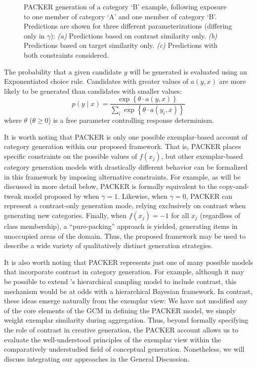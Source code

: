 \documentclass[12pt]{article}
\newcommand\inputpgf[2]{{
\let\pgfimageWithoutPath\pgfimage
\renewcommand{\pgfimage}[2][]{\pgfimageWithoutPath[##1]{#1/##2}}

}}
\begin{document}
\begin{flushleft}
\begin{figure}
	\begin{center}
		\inputpgf{figs/}{packer-examples.pgf}
		\caption{PACKER generation of a category `B' example, following exposure to one member of category `A' and one member of category `B'. Predictions are shown for three different parameterizations (differing only in $\gamma$): {\em (a)} Predictions based on contrast similarity only. {\em (b)} Predictions based on target similarity only.  {\em (c)} Predictions with both constraints considered.}
		\label{fig:packer-examples}
	\end{center}
\end{figure}

The probability that a given candidate $y$ will be generated is evaluated using an Exponentiated \citet{luce1977choice} choice rule. Candidates with greater values of $a(y,x)$ are more likely to be generated than candidates with smaller values:
% 
\begin{equation}
p(y \mid x) = \dfrac
{ \exp  \left \{ \theta \cdot a \left( y, x \right) \right \} } 
{ \sum_i{ \exp  \left \{ \theta \cdot a \left( y_i, x \right) \right\}  } }
\label{eq:packer-choice}
\end{equation}
% 
where $\theta$ ($\theta \geq 0$) is a free parameter controlling response determinism. 

It is worth noting that PACKER is only one possible exemplar-based account of category generation within our proposed framework. That is, PACKER places specific constraints on the possible values of $f(x_j)$, but other exemplar-based category generation models with drastically different behavior can be formalized in this framework by imposing alternative constraints. For example, as will be discussed in more detail below, PACKER is formally equivalent to the copy-and-tweak model proposed by \cite{jern2013probabilistic} when $\gamma = 1$. Likewise, when $\gamma = 0$, PACKER can represent a contrast-only generation mode, relying exclusively on contrast when generating new categories. Finally, when $f(x_j) = -1$ for all $x_j$ (regardless of class membership), a ``pure-packing'' approach is yielded, generating items in unoccupied areas of the domain. Thus, the proposed framework may be used to describe a wide variety of qualitatively distinct generation strategies.


It is also worth noting that PACKER represents just one of many possible models that incorporate contrast in category generation. For example, although it may be possible to extend \cite{jern2013probabilistic}'s hierarchical sampling model to include contrast, this mechanism would be at odds with a hierarchical Bayesian framework. In contrast, these ideas emerge naturally from the exemplar view: We have not modified any of the core elements of the GCM in defining the PACKER model, we simply weight exemplar similarity during aggregation. Thus, beyond formally specifying the role of contrast in creative generation, the PACKER account allows us to evaluate the well-understood principles of the exemplar view within the comparatively understudied field of conceptual generation. Nonetheless, we will discuss integrating our approaches in the General Discussion.


\end{flushleft}
\end{document}
